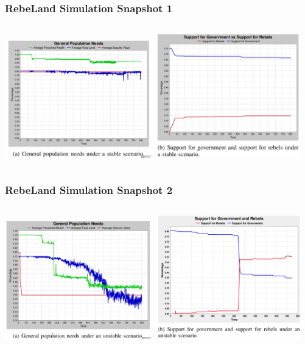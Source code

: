 \documentclass{beamer}
\begin{document}
\begin{frame}
	\frametitle{RebeLand Simulation Snapshot 1}
	\begin{columns}[c]
	\column{2.5in}
		\centering
		\includegraphics[width=2.5in,keepaspectratio]{population-need-stable.pdf}	
	\column{2.5in}
		\centering
		\includegraphics[width=2.5in,keepaspectratio]{support-stable.pdf}	
	\end{columns}
\end{frame}
\begin{frame}
	\frametitle{RebeLand Simulation Snapshot 2}
	\begin{columns}[c]
	\column{2.5in}
		\centering
		\includegraphics[width=2.5in,keepaspectratio]{population-need-unstable.pdf}	
	\column{2.5in}
		\centering
		\includegraphics[width=2.5in,keepaspectratio]{support-unstable.pdf}	
	\end{columns}
\end{frame}
\end{document}
